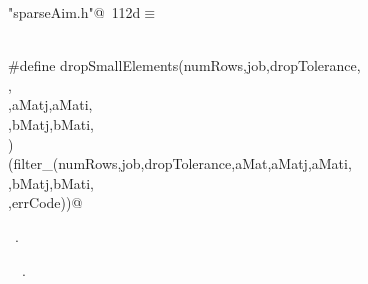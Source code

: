 \documentclass{article}
\begin{document}
\begin{description}
\begin{flushleft}
\begin{minipage}{\linewidth}
\begin{list}{}{\setlength{\itemsep}{-\parsep}\setlength{\itemindent}{-\leftmargin}}
\item{}
\end{list}
\end{minipage}\vspace{4ex}
\end{flushleft}
\item[filter small values]
\begin{flushleft} \small
\begin{minipage}{\linewidth}\label{scrap199}\raggedright\small
{} \verb@"sparseAim.h"@\nobreak\ {\footnotesize {112d}}$\equiv$
\vspace{-1ex}
\begin{list}{}{} \item
\mbox{}\verb@@\\
\mbox{}\verb@#define dropSmallElements(numRows,job,dropTolerance, \@\\
\mbox{}\verb@spaceAllocated, \@\\
\mbox{}\verb@aMat,aMatj,aMati, \@\\
\mbox{}\verb@bMat,bMatj,bMati, \@\\
\mbox{}\verb@errCode) \@\\
\mbox{}\verb@(filter_(numRows,job,dropTolerance,aMat,aMatj,aMati, \@\\
\mbox{}\verb@bMat,bMatj,bMati, \@\\
\mbox{}\verb@spaceAllocated,errCode))@\\
\mbox{}\verb@@{\NWsep}
\end{list}
\vspace{-1.5ex}
\footnotesize
\begin{list}{}{\setlength{\itemsep}{-\parsep}\setlength{\itemindent}{-\leftmargin}}
\item \NWtxtFileDefBy\ .
\item \NWtxtIdentsUsed\nobreak\  \verb@job@\nobreak\ .
\item{}
\end{list}
\end{minipage}\vspace{4ex}

\end{flushleft}
\end{description}
\end{document}
